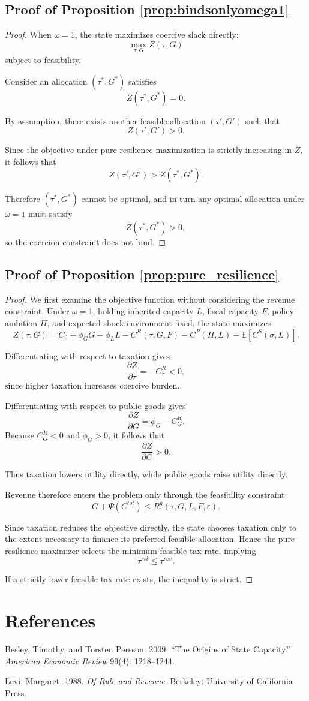 \documentclass[12pt]{article}
\newcommand{\E}{\mathbb{E}}
\begin{document}
\subsection{Proof of Proposition \ref{prop:bindsonlyomega1}}

\begin{proof}
When \(\omega=1\), the state maximizes coercive slack directly:
\[
\max_{\tau,G} Z(\tau,G)
\]
subject to feasibility.

Consider an allocation \((\tau^*,G^*)\) satisfies
\[\label{eq:Ztaustar}
Z(\tau^*,G^*)=0.
\]

By assumption, there exists another feasible allocation \((\tau',G')\) such that
\[
Z(\tau',G')>0.
\]

Since the objective under pure resilience maximization is strictly increasing in \(Z\), it follows that
\[
Z(\tau',G') > Z(\tau^*,G^*).
\]

Therefore \((\tau^*,G^*)\) cannot be optimal, and in turn any optimal allocation under \(\omega=1\) must satisfy
\[
Z(\tau^*,G^*)>0,
\]
so the coercion constraint does not bind.
\end{proof}

\subsection{Proof of Proposition \ref{prop:pure_resilience}}

\begin{proof}
We first examine the objective function without considering the revenue constraint. Under $\omega=1$, holding inherited capacity $L$, fiscal capacity $F$, policy ambition $\Pi$, and expected shock environment fixed, the state maximizes
\[
Z(\tau,G)=\bar C_0 + \phi_G G + \phi_L L - C^R(\tau,G,F) - C^P(\Pi,L) - \E[C^S(\sigma,L)].
\]

Differentiating with respect to taxation gives
\[
\frac{\partial Z}{\partial \tau}=-C^R_\tau<0,
\]
since higher taxation increases coercive burden.

Differentiating with respect to public goods gives
\[
\frac{\partial Z}{\partial G}=\phi_G-C^R_G.
\]
Because $C^R_G<0$ and $\phi_G>0$, it follows that
\[
\frac{\partial Z}{\partial G}>0.
\]

Thus taxation lowers utility directly, while public goods raise utility directly.

Revenue therefore enters the problem only through the feasibility constraint:
\[
G+\Psi(C^{tot}) \le R^g(\tau,G,L,F,\varepsilon).
\]

Since taxation reduces the objective directly, the state chooses taxation only to the extent necessary to finance its preferred feasible allocation. Hence the pure resilience maximizer selects the minimum feasible tax rate, implying
\[
\tau^{rsl}\le \tau^{rev}.
\]

If a strictly lower feasible tax rate exists, the inequality is strict.
\end{proof}


\section*{References}

Besley, Timothy, and Torsten Persson. 2009. ``The Origins of State Capacity.'' \emph{American Economic Review} 99(4): 1218--1244.

Levi, Margaret. 1988. \emph{Of Rule and Revenue}. Berkeley: University of California Press.
\end{document}
